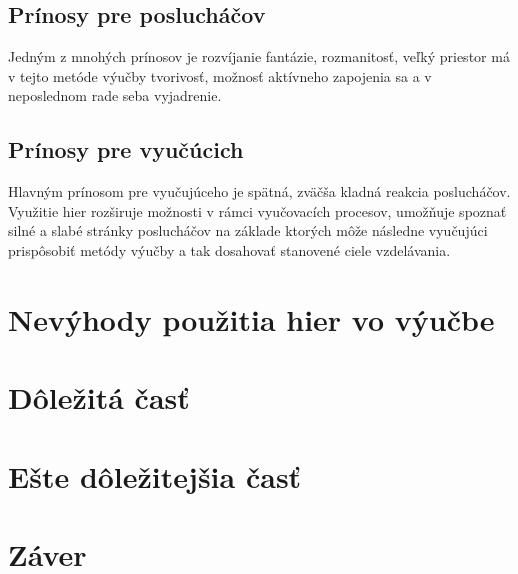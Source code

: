 \documentclass[10pt,twoside,slovak,a4paper]{article}
\begin{document}
\subsection{Prínosy pre poslucháčov}

Jedným z mnohých prínosov je rozvíjanie fantázie, rozmanitosť, veľký priestor má v tejto metóde výučby tvorivosť, možnosť aktívneho zapojenia sa a v neposlednom rade seba vyjadrenie.

\subsection{Prínosy pre vyučúcich}

Hlavným prínosom pre vyučujúceho je spätná, zväčša kladná reakcia poslucháčov. Využitie hier rozširuje možnosti v rámci vyučovacích procesov, umožňuje spoznať silné a slabé stránky poslucháčov na základe ktorých môže následne vyučujúci prispôsobiť metódy výučby a tak dosahovať stanovené ciele vzdelávania.

\section{Nevýhody použitia hier vo výučbe}










\section{Dôležitá časť} \label{dolezita}




\section{Ešte dôležitejšia časť} \label{dolezitejsia}




\section{Záver} \label{zaver} %





\end{document}
